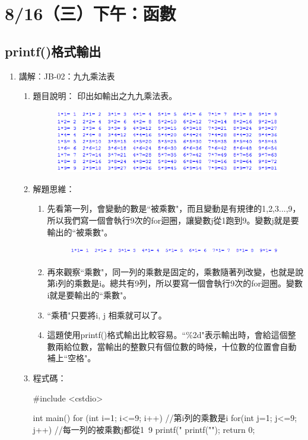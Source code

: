 \section{8/16（三）下午：函數}
\subsection{printf()格式輸出}
\begin{enumerate}
	\item 講解︰JB-02：九九乘法表
		\begin{enumerate}
			\item 題目說明：
			\subitem 印出如輸出之九九乘法表。
			\begin{figure}[h]
				\centering
				\includegraphics[width=12cm]{fig/JB02fig}
			\end{figure}
			\item 解題思維：
			\begin{enumerate}
				\item 先看第一列，會變動的數是``被乘數"，而且變動是有規律的1,2,3...,9，所以我們寫一個會執行9次的for迴圈，讓變數j從1跑到9。變數j就是要輸出的``被乘數"。
				\begin{figure}[H]
					\centering
					\includegraphics[width=12cm]{fig/JB02fig_2}
				\end{figure}
				\item 再來觀察``乘數"，同一列的乘數是固定的，乘數隨著列改變，也就是說第i列的乘數是i。總共有9列，所以要寫一個會執行9次的for迴圈。變數i就是要輸出的``乘數"。
				\item ``乘積"只要將i, j 相乘就可以了。
				\item 這題使用printf()格式輸出比較容易。``\%2d"表示輸出時，會給這個整數兩給位數，當輸出的整數只有個位數的時候，十位數的位置會自動補上``空格"。
			\end{enumerate}
			
			\item 程式碼：
			\begin{cppcode}
			#include <cstdio>
			
			int main()
			{
				for (int i=1; i<=9; i++) {//第i列的乘數是i
					for(int j=1; j<=9; j++) {//每一列的被乘數j都從1~9
						printf("%
					}
					printf("\n");
				}
				return 0;
			}
				

\end{cppcode}
\end{enumerate}
\end{enumerate}
